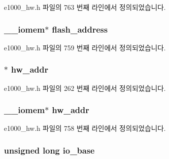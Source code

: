 e1000\+\_\+hw.\+h 파일의 763 번째 라인에서 정의되었습니다.

\subsubsection[{\texorpdfstring{flash\+\_\+address}{flash_address}}]{ \+\_\+\+\_\+iomem$\ast$ flash\+\_\+address}\hypertarget{structe1000__hw_a43f200a8ab8b32b6c7092611bef689c2}{}\label{structe1000__hw_a43f200a8ab8b32b6c7092611bef689c2}


e1000\+\_\+hw.\+h 파일의 759 번째 라인에서 정의되었습니다.

\subsubsection[{\texorpdfstring{hw\+\_\+addr}{hw_addr}}]{$\ast$ hw\+\_\+addr}\hypertarget{structe1000__hw_a2e65a30df9b06ba2471e4fdb1cbd9f6b}{}\label{structe1000__hw_a2e65a30df9b06ba2471e4fdb1cbd9f6b}


e1000\+\_\+hw.\+h 파일의 262 번째 라인에서 정의되었습니다.

\subsubsection[{\texorpdfstring{hw\+\_\+addr}{hw_addr}}]{ \+\_\+\+\_\+iomem$\ast$ hw\+\_\+addr}\hypertarget{structe1000__hw_a54127b9ee5d8173dc068cf8c43a0600f}{}\label{structe1000__hw_a54127b9ee5d8173dc068cf8c43a0600f}


e1000\+\_\+hw.\+h 파일의 758 번째 라인에서 정의되었습니다.

\subsubsection[{\texorpdfstring{io\+\_\+base}{io_base}}]{\setlength{\rightskip}{0pt plus 5cm}unsigned long io\+\_\+base}\hypertarget{structe1000__hw_ade48a0e63a0aea4cf71e4185ebe69f7a}{}\label{structe1000__hw_ade48a0e63a0aea4cf71e4185ebe69f7a}


